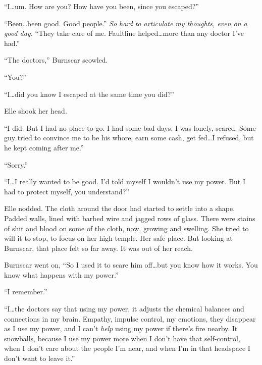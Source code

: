 ``I\ldots um.  How are you?  How have you been, since you escaped?''



``Been\ldots been good.  Good people.''  \emph{So hard to articulate my thoughts, even on a good day.} ``They take care of me.  Faultline helped\ldots more than any doctor I've had.''



``The doctors,'' Burnscar scowled.



``You?''



``I\ldots did you know I escaped at the same time you did?''



Elle shook her head.



``I did.  But I had no place to go.  I had some bad days.  I was lonely, scared.  Some guy tried to convince me to be his whore, earn some cash, get fed\ldots I refused, but he kept coming after me.''



``Sorry.''



``I\ldots I really wanted to be good.  I'd told myself I wouldn't use my power.  But I had to protect myself, you understand?''



Elle nodded.  The cloth around the door had started to settle into a shape.  Padded walls, lined with barbed wire and jagged rows of glass.  There were stains of shit and blood on some of the cloth, now, growing and swelling.  She tried to will it to stop, to focus on her high temple.  Her safe place.  But looking at Burnscar, that place felt so far away.  It was out of her reach.



Burnscar went on, ``So I used it to scare him off\ldots but you know how it works.  You know what happens with my power.''



``I remember.''



``I\ldots the doctors say that using my power, it adjusts the chemical balances and connections in my brain.  Empathy, impulse control, my emotions, they disappear as I use my power, and I can't \emph{help} using my power if there's fire nearby.  It snowballs, because I use my power more when I don't have that self-control, when I don't care about the people I'm near, and when I'm in that headspace I don't want to leave it.''



